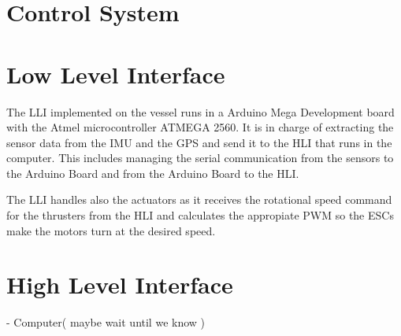 \section{Control System}\label{sec:ControlComputation}

\section{Low Level Interface} 

The LLI implemented on the vessel runs in a Arduino Mega Development board with the Atmel microcontroller ATMEGA 2560. It is in charge of extracting the sensor data from the IMU and the GPS and send it to the HLI that runs in the computer. This includes managing the serial communication from the sensors to the Arduino Board and from the Arduino Board to the HLI. 

The LLI handles also the actuators as it receives the rotational speed command for the thrusters from the HLI and calculates the appropiate PWM so the ESCs make the motors turn at the desired speed.

\section{High Level Interface} - Computer( maybe wait until we know )



